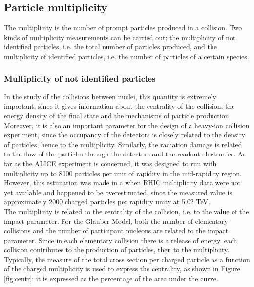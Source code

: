 \subsection{Particle multiplicity}
The multiplicity is the number of prompt particles produced in a collision. Two kinds of multiplicity measurements can be carried out: the multiplicity of not identified particles, i.e. the total number of particles produced, and the multiplicity of identified particles, i.e. the number of particles of a certain species.
\subsubsection{Multiplicity of not identified particles}
In the study of the collisions between nuclei, this quantity is extremely important, since it gives information about the centrality of the collision, the energy density of the final state and the mechanisms of particle production. Moreover, it is also an important parameter for the design of a heavy-ion collision experiment, since the occupancy of the detectors is closely related to the density of particles, hence to the multiplicity. Similarly, the radiation damage is related to the flow of the particles through the detectors and the readout electronics. As far as the ALICE experiment is concerned, it was designed to run with multiplicity up to 8000 particles per unit of rapidity in the mid-rapidity region. However, this estimation was made in a when RHIC multiplicity data were not yet available and happened to be overestimated, since the measured value is approximately 2000 charged particles per rapidity unity at 5.02 TeV\cite{mult}.\\  
The multiplicity is related to the centrality of the collision, i.e. to the value of the impact parameter. For the Glauber Model, both the number of elementary collisions and the number of participant nucleons are related to the impact parameter. Since in each elementary collision there is a release of energy, each collision contributes to the production of particles, then to the multiplicity. Typically, the measure of the total cross section per charged particle as a function of the charged multiplicity is used to express the centrality, as shown in Figure \ref{fig:centr}: it is expressed as the percentage of the area under the curve.\\
%
